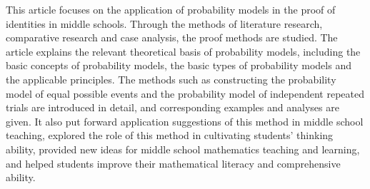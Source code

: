 
\begin{abstract}
  本文关注概率模型在中学恒等式证明中的应用，通过文献研究法、对比研究法和案例分析法，研究其证明方式。文章阐释了概率模型的相关理论基础，包括概率模型基本概念、概率模型基本类型和适用原理。详细介绍利用构造等可能事件概率模型、独立重复试验概率模型等方法，并给出相应实例和分析。还提出了该方法在中学教学中的应用建议，探讨这种方法对培养学生思维能力的作用，为中学数学教学与学习提供新的思路，帮助学生提升数学素养与综合能力。
\end{abstract}



\begin{abstract*}
  This article focuses on the application of probability models in the proof of identities in middle schools. Through the methods of literature research, comparative research and case analysis, the proof methods are studied. The article explains the relevant theoretical basis of probability models, including the basic concepts of probability models, the basic types of probability models and the applicable principles. The methods such as constructing the probability model of equal possible events and the probability model of independent repeated trials are introduced in detail, and corresponding examples and analyses are given. It also put forward application suggestions of this method in middle school teaching, explored the role of this method in cultivating students' thinking ability, provided new ideas for middle school mathematics teaching and learning, and helped students improve their mathematical literacy and comprehensive ability.

\end{abstract*}